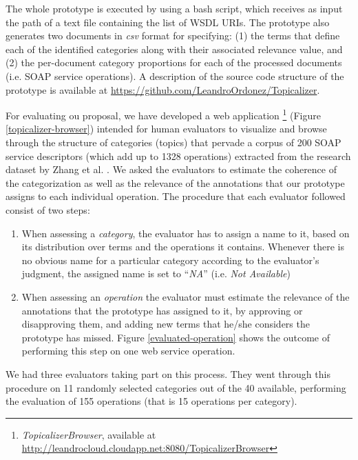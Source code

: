 The whole prototype is executed by using a bash script, which receives as input the path of a text file containing the list of WSDL URIs. The prototype also generates two documents in \emph{csv} format for specifying: (1) the terms that define each of the identified categories along with their associated relevance value, and (2) the per-document category proportions for each of the processed documents (i.e. SOAP service operations).  
A description of the source code structure of the prototype is available at \href{https://github.com/LeandroOrdonez/Topicalizer}{https://github.com/LeandroOrdonez/Topicalizer}.

For evaluating ou proposal, we have developed a web application \footnote{\textit{TopicalizerBrowser}, available at \href{http://leandrocloud.cloudapp.net:8080/TopicalizerBrowser}{http://leandrocloud.cloudapp.net:8080/TopicalizerBrowser}} (Figure \ref{topicalizer-browser}) intended for human evaluators to visualize and browse through the structure of categories (topics) that pervade a corpus of 200 SOAP service descriptors (which add up to 1328 operations) extracted from the research dataset by Zhang et al. \cite{Zhang:2010}. We asked the evaluators to estimate the coherence of the categorization as well as the relevance of the annotations that our prototype assigns to each individual operation. The procedure that each evaluator followed consist of two steps:

\begin{enumerate}
 \item When assessing a \textit{category}, the evaluator has to assign a name to it, based on its distribution over terms and the operations it contains. Whenever there is no obvious name for a particular category according to the evaluator's judgment, the assigned name is set to ``\textit{NA}'' (i.e. \textit{Not Available})
 \item When assessing an \textit{operation} the evaluator must estimate the relevance of the annotations that the prototype has assigned to it, by approving or disapproving them, and adding new terms that he/she considers the prototype has missed. Figure \ref{evaluated-operation} shows the outcome of performing this step on one web service operation.
\end{enumerate}

We had three evaluators taking part on this process. They went through this procedure on 11 randomly selected categories out of the 40 available, performing the evaluation of 155 operations (that is 15 operations per category).


